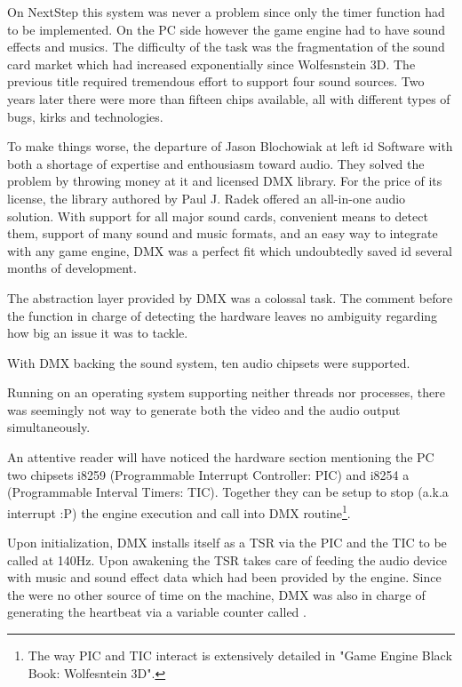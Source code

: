 On NextStep this system was never a problem since only the timer function had to be implemented. On the PC side however the game engine had to have sound effects and musics. The difficulty of the task was the fragmentation of the sound card market which had increased exponentially since Wolfesnstein 3D. The previous title required tremendous effort to support four sound sources. Two years later there were more than fifteen chips available, all with different types of bugs, kirks and technologies.\\
\par
To make things worse, the departure of Jason Blochowiak  at left id Software with both a shortage of expertise and enthousiasm toward audio. They solved the problem by throwing money at it and licensed DMX library. For the price of its license, the library authored by Paul J. Radek offered an all-in-one audio solution. With support for all major sound cards, convenient means to detect them, support of many sound and music formats, and an easy way to integrate with any game engine, DMX was a perfect fit which undoubtedly saved id several months of development.





The abstraction layer provided by DMX was a colossal task. The comment before the function in charge of detecting the hardware leaves no ambiguity regarding how big an issue it was to tackle.\\
\par
{}
\par
With DMX backing the sound system, ten audio chipsets were supported.\\
\par
{}
\par
Running on an operating system supporting neither threads nor processes, there was seemingly not way to generate both the video and the audio output simultaneously.\\
\par
 An attentive reader will have noticed the hardware section mentioning the PC two chipsets i8259 (Programmable Interrupt Controller: PIC) and i8254 a (Programmable Interval Timers: TIC). Together they can be setup to stop (a.k.a interrupt :P) the engine execution and call into DMX routine\footnote{The way PIC and TIC interact is extensively detailed in "Game Engine Black Book: Wolfesntein 3D".}.\\
\par
Upon initialization, DMX installs itself as a TSR via the PIC and the TIC to be called at 140Hz. Upon awakening the TSR takes care of feeding the audio device with music and sound effect data which had been provided by the engine. Since the were no other source of time on the machine, DMX was also in charge of generating the heartbeat via a variable counter called .
\par


